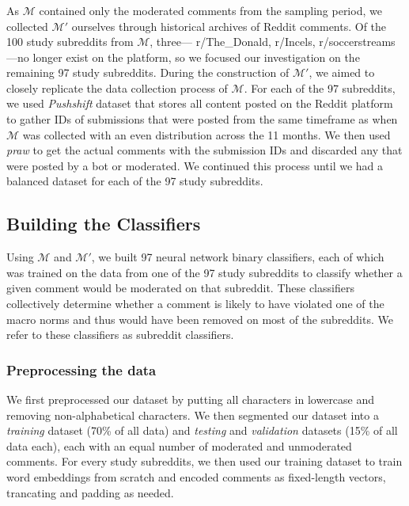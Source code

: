 \subsubsection{} 
As $\mathcal{M}$ contained only the moderated comments from the sampling period, we collected $\mathcal{M'}$ ourselves through historical archives of Reddit comments. Of the 100 study subreddits from $\mathcal{M}$, three--- r/The\_Donald, r/Incels, r/soccerstreams---no longer exist on the platform, so we focused our investigation on the remaining 97 study subreddits. During the construction of $\mathcal{M'}$, we aimed to closely replicate the data collection process of $\mathcal{M}$. For each of the 97 subreddits, we used \textit{Pushshift} dataset that stores all content posted on the Reddit platform to gather IDs of submissions that were posted from the same timeframe as when $\mathcal{M}$ was collected with an even distribution across the 11 months. We then used \textit{praw} to get the actual comments with the submission IDs and discarded any that were posted by a bot or moderated. We continued this process until we had a balanced dataset for each of the 97 study subreddits.





\subsection{Building the Classifiers}
Using $\mathcal{M}$ and $\mathcal{M'}$, we built 97 neural network binary classifiers, each of which was trained on the data from one of the 97 study subreddits to classify whether a given comment would be moderated on that subreddit. These classifiers collectively determine whether a comment is likely to have violated one of the macro norms and thus would have been removed on most of the subreddits. We refer to these classifiers as subreddit classifiers. 

\subsubsection{Preprocessing the data} 
We first preprocessed our dataset by putting all characters in lowercase and removing non-alphabetical characters. We then segmented our dataset into a \textit{training} dataset (70\% of all data) and \textit{testing} and \textit{validation} datasets (15\% of all data each), each with an equal number of moderated and unmoderated comments. For every study subreddits, we then used our training dataset to train word embeddings from scratch and encoded comments as fixed-length vectors, trancating and padding as needed. 

